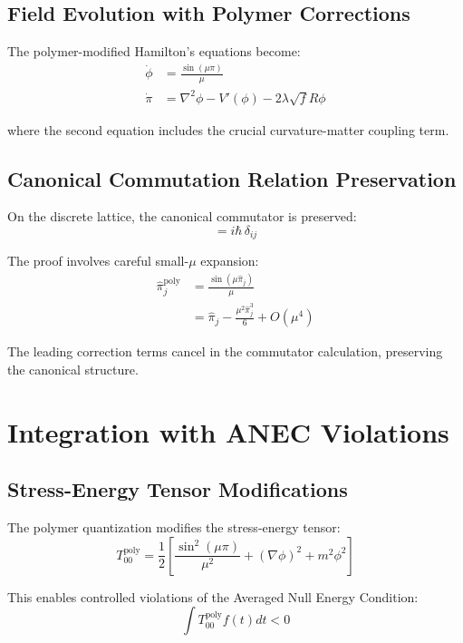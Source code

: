 \documentclass[11pt]{article}
\begin{document}
\subsection{Field Evolution with Polymer Corrections}

The polymer-modified Hamilton's equations become:
\begin{align}
\dot{\phi} &= \frac{\sin(\mu \pi)}{\mu} \\
\dot{\pi} &= \nabla^2\phi - V'(\phi) - 2\lambda\sqrt{f}R\phi
\end{align}

where the second equation includes the crucial curvature-matter coupling term.

\subsection{Canonical Commutation Relation Preservation}

On the discrete lattice, the canonical commutator is preserved:
\begin{equation}
[\hat{\phi}_i, \hat{\pi}_j^{\text{poly}}] = i\hbar\,\delta_{ij}
\end{equation}

The proof involves careful small-$\mu$ expansion:
\begin{align}
\hat{\pi}_j^{\text{poly}} &= \frac{\sin(\mu\hat{\pi}_j)}{\mu} \\
&= \hat{\pi}_j - \frac{\mu^2\hat{\pi}_j^3}{6} + O(\mu^4)
\end{align}

The leading correction terms cancel in the commutator calculation, preserving the canonical structure.

\section{Integration with ANEC Violations}

\subsection{Stress-Energy Tensor Modifications}

The polymer quantization modifies the stress-energy tensor:
\begin{equation}
T_{00}^{\text{poly}} = \frac{1}{2}\left[\frac{\sin^2(\mu\pi)}{\mu^2} + (\nabla\phi)^2 + m^2\phi^2\right]
\end{equation}

This enables controlled violations of the Averaged Null Energy Condition:
\begin{equation}
\int T_{00}^{\text{poly}} f(t) dt < 0
\end{equation}
\end{document}
